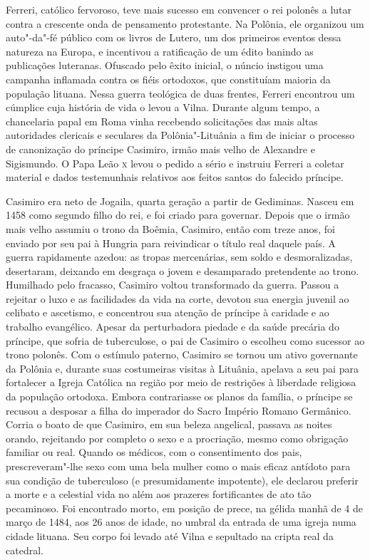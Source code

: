 

Ferreri, católico fervoroso, teve mais sucesso em convencer o rei
polonês a lutar contra a crescente onda de pensamento protestante. Na
Polônia, ele organizou um auto"-da"-fé público com os livros de Lutero, um
dos primeiros eventos dessa natureza na Europa, e incentivou a
ratificação de um édito banindo as publicações luteranas. Ofuscado pelo
êxito inicial, o núncio instigou uma campanha inflamada contra os fiéis
ortodoxos, que constituíam maioria da população lituana. Nessa guerra
teológica de duas frentes, Ferreri encontrou um cúmplice cuja história de
vida o levou a Vilna. Durante algum tempo, a chancelaria papal em Roma
vinha recebendo solicitações das mais altas autoridades clericais e
seculares da Polônia"-Lituânia a fim de iniciar o processo de canonização
do príncipe Casimiro, irmão mais velho de Alexandre e Sigismundo. O Papa
Leão \textsc{x} levou o pedido a sério e instruiu Ferreri a coletar material e
dados testemunhais relativos aos feitos santos do falecido príncipe.

Casimiro era neto de Jogaila, quarta geração a partir de Gediminas.
Nasceu em 1458 como segundo filho do rei, e foi criado para governar.
Depois que o irmão mais velho assumiu o trono da Boêmia, Casimiro, então
com treze anos, foi enviado por seu pai à Hungria para reivindicar o
título real daquele país. A guerra rapidamente azedou: as tropas
mercenárias, sem soldo e desmoralizadas, desertaram, deixando em
desgraça o jovem e desamparado pretendente ao trono. Humilhado pelo
fracasso, Casimiro voltou transformado da guerra. Passou a rejeitar o
luxo e as facilidades da vida na corte, devotou sua energia juvenil ao
celibato e ascetismo, e concentrou sua atenção de príncipe à caridade e
ao trabalho evangélico. Apesar da perturbadora piedade e da saúde
precária do príncipe, que sofria de tuberculose, o pai de Casimiro o
escolheu como sucessor ao trono polonês. Com o estímulo paterno,
Casimiro se tornou um ativo governante da Polônia e, durante suas
costumeiras visitas à Lituânia, apelava a seu pai para fortalecer a
Igreja Católica na região por meio de restrições à liberdade religiosa
da população ortodoxa. Embora contrariasse os planos da família, o
príncipe se recusou a desposar a filha do imperador do Sacro Império
Romano Germânico. Corria o boato de que Casimiro, em sua beleza
angelical, passava as noites orando, rejeitando por completo o sexo e a
procriação, mesmo como obrigação familiar ou real. Quando os médicos,
com o consentimento dos pais, prescreveram"-lhe sexo com uma bela mulher
como o mais eficaz antídoto para sua condição de tuberculoso (e
presumidamente impotente), ele declarou preferir a morte e a celestial
vida no além aos prazeres fortificantes de ato tão pecaminoso. Foi
encontrado morto, em posição de prece, na gélida manhã de 4 de março de
1484, aos 26 anos de idade, no umbral da entrada de uma igreja
numa cidade lituana. Seu corpo foi levado até Vilna e sepultado na
cripta real da catedral.

